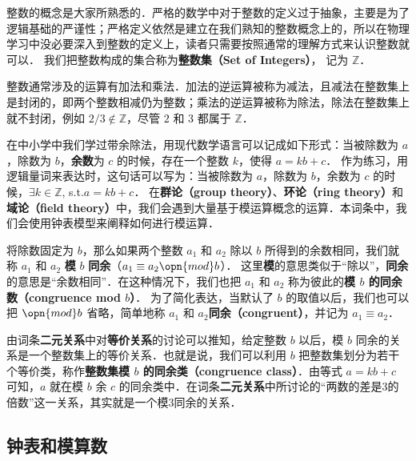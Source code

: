 


整数的概念是大家所熟悉的．严格的数学中对于整数的定义过于抽象，主要是为了逻辑基础的严谨性；严格定义依然是建立在我们熟知的整数概念上的，所以在物理学习中没必要深入到整数的定义上，读者只需要按照通常的理解方式来认识整数就可以． 我们把整数构成的集合称为\textbf{整数集（Set of Integers）}， 记为 $\mathbb{Z}$．

整数通常涉及的运算有加法和乘法．加法的逆运算被称为减法，且减法在整数集上是封闭的，即两个整数相减仍为整数；乘法的逆运算被称为除法，除法在整数集上就不封闭，例如 $2/3\not\in\mathbb{Z}$，尽管 $2$ 和 $3$ 都属于 $\mathbb{Z}$．

在中小学中我们学过带余除法，用现代数学语言可以记成如下形式：当被除数为 $a$，除数为 $b$，\textbf{余数}为 $c$ 的时候，存在一个整数 $k$，使得 $a=kb+c$． 作为练习，用逻辑量词来表达时，这句话可以写为：当被除数为 $a$，除数为 $b$，余数为 $c$ 的时候，$\exists k\in \mathbb{Z}$, s.t.$ a=kb+c$． 在\textbf{群论（group theory）}、\textbf{环论（ring theory）}和\textbf{域论（field theory）}中，我们会遇到大量基于模运算概念的运算．本词条中，我们会使用钟表模型来阐释如何进行模运算．

将除数固定为 $b$，那么如果两个整数 $a_1$ 和 $a_2$ 除以 $b$ 所得到的余数相同，我们就称 $a_1$ 和 $a_2$ \textbf{模} $b$ \textbf{同余}（$a_1\equiv a_2 \opn{mod} b$）． 这里\textbf{模}的意思类似于“除以”，\textbf{同余}的意思是“余数相同”．在这种情况下，我们也把 $a_1$ 和 $a_2$ 称为彼此的\textbf{模 $b$ 的同余数（congruence mod $b$）}． 为了简化表达，当默认了 $b$ 的取值以后，我们也可以把 $\opn{mod} b$ 省略，简单地称 $a_1$ 和 $a_2$\textbf{同余（congruent）}，并记为 $a_1\equiv a_2$． 

由词条\textbf{二元关系}中对\textbf{等价关系}的讨论可以推知，给定整数 $b$ 以后，模 $b$ 同余的关系是一个整数集上的等价关系．也就是说，我们可以利用 $b$ 把整数集划分为若干个等价类，称作\textbf{整数集模 $b$ 的同余类（congruence class）}．由等式 $a=kb+c$ 可知，$a$ 就在模 $b$ 余 $c$ 的同余类中．在词条\textbf{二元关系}中所讨论的“两数的差是3的倍数”这一关系，其实就是一个模3同余的关系．



\subsection{钟表和模算数}

